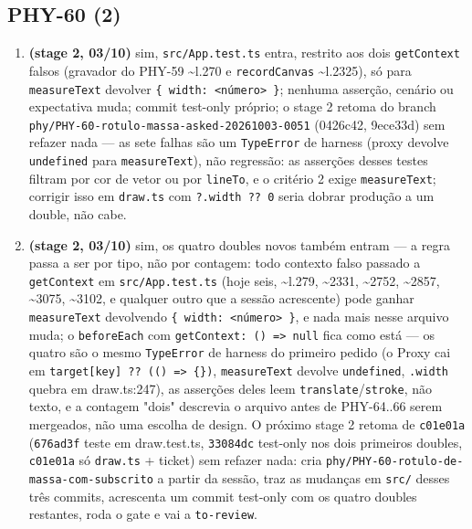 \documentclass[11pt,a4paper]{article}
\begin{document}
{\small\sloppy
\subsection*{PHY-60 (2)}
\begin{enumerate}
  \item \textbf{(stage 2, 03/10)} sim, \texttt{src/App.test.ts} entra, restrito aos dois \texttt{getContext} falsos (gravador do PHY-59 \textasciitilde{}l.270 e \texttt{recordCanvas} \textasciitilde{}l.2325), só para \texttt{measureText} devolver \texttt{\{ width: <número> \}}; nenhuma asserção, cenário ou expectativa muda; commit test-only próprio; o stage 2 retoma do branch \texttt{phy/PHY-60-rotulo-massa-asked-20261003-0051} (0426c42, 9ece33d) sem refazer nada --- as sete falhas são um \texttt{TypeError} de harness (proxy devolve \texttt{undefined} para \texttt{measureText}), não regressão: as asserções desses testes filtram por cor de vetor ou por \texttt{lineTo}, e o critério 2 exige \texttt{measureText}; corrigir isso em \texttt{draw.ts} com \texttt{?.width ?? 0} seria dobrar produção a um double, não cabe.
  \item \textbf{(stage 2, 03/10)} sim, os quatro doubles novos também entram --- a regra passa a ser por tipo, não por contagem: todo contexto falso passado a \texttt{getContext} em \texttt{src/App.test.ts} (hoje seis, \textasciitilde{}l.279, \textasciitilde{}2331, \textasciitilde{}2752, \textasciitilde{}2857, \textasciitilde{}3075, \textasciitilde{}3102, e qualquer outro que a sessão acrescente) pode ganhar \texttt{measureText} devolvendo \texttt{\{ width: <número> \}}, e nada mais nesse arquivo muda; o \texttt{beforeEach} com \texttt{getContext: () => null} fica como está --- os quatro são o mesmo \texttt{TypeError} de harness do primeiro pedido (o Proxy cai em \texttt{target[key] ?? (() => \{\})}, \texttt{measureText} devolve \texttt{undefined}, \texttt{.width} quebra em draw.ts:247), as asserções deles leem \texttt{translate}/\texttt{stroke}, não texto, e a contagem "dois" descrevia o arquivo antes de PHY-64..66 serem mergeados, não uma escolha de design. O próximo stage 2 retoma de \texttt{c01e01a} (\texttt{676ad3f} teste em draw.test.ts, \texttt{33084dc} test-only nos dois primeiros doubles, \texttt{c01e01a} só \texttt{draw.ts} + ticket) sem refazer nada: cria \texttt{phy/PHY-60-rotulo-de-massa-com-subscrito} a partir da sessão, traz as mudanças em \texttt{src/} desses três commits, acrescenta um commit test-only com os quatro doubles restantes, roda o gate e vai a \texttt{to-review}.
\end{enumerate}
}
\end{document}
